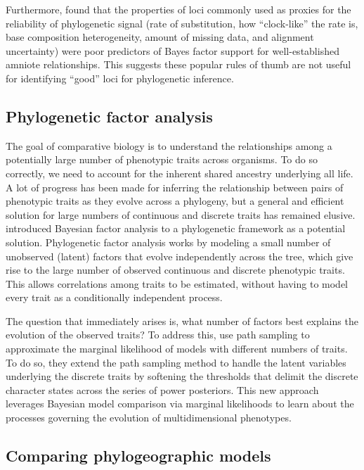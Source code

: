 Furthermore, \citet{Brown2017} found that the properties
of loci commonly used as proxies for the reliability of phylogenetic signal
(rate of substitution, how ``clock-like'' the rate is, base composition
heterogeneity, amount of missing data, and alignment uncertainty) were poor
predictors of Bayes factor support for well-established amniote relationships.
This suggests these popular rules of thumb are not useful for identifying
``good'' loci for phylogenetic inference.


\subsection{Phylogenetic factor analysis}

The goal of comparative biology is to understand the relationships among a
potentially large number of phenotypic traits across organisms. 
To do so correctly, we need to account for the inherent shared ancestry
underlying all life\citep{Felsenstein1985PIC}.
A lot of progress has been made for inferring the relationship between pairs
of phenotypic traits as they evolve across a phylogeny,
but a general and efficient solution for large numbers of continuous
and discrete traits has remained elusive.
\citet{Tolkoff2017} introduced Bayesian factor analysis to
a phylogenetic framework as a potential solution.
Phylogenetic factor analysis works by modeling a small number of unobserved
(latent) factors that evolve independently across the tree, which give rise to
the large number of observed continuous and discrete phenotypic traits.
This allows correlations among traits to be estimated, without having to model
every trait as a conditionally independent process.

The question that immediately arises is, what number of factors best explains
the evolution of the observed traits?
To address this, \citep{Tolkoff2017} use path sampling to approximate the
marginal likelihood of models with different numbers of traits.
To do so, they extend the path sampling method to handle the latent variables
underlying the discrete traits by softening the thresholds that delimit the
discrete character states across the series of power posteriors.
This new approach leverages Bayesian model comparison via marginal likelihoods
to learn about the processes governing the evolution of multidimensional
phenotypes.


\subsection{Comparing phylogeographic models}

